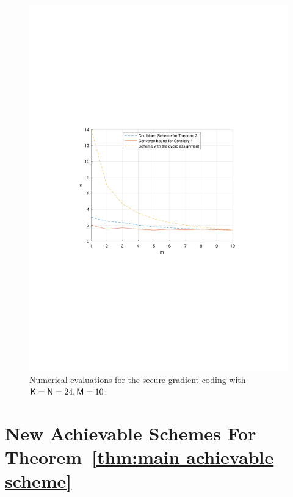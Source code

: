 \documentclass[conference,letterpaper]{IEEEtran}
\begin{document}
\begin{figure}[ht]
        \includegraphics[scale=0.45]{m varies.pdf}
    \caption{\small Numerical evaluations for the secure gradient coding with ${\sf K} = {\sf N}=24, {\sf M}=10$.}
    \label{fig:numerical 1}
\end{figure}



\section{New Achievable Schemes For Theorem~\ref{thm:main achievable scheme}}
\label{sec:Achievable coding scheme}

\end{document}
